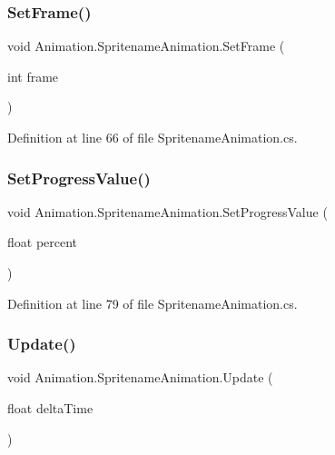 \subsubsection{\texorpdfstring{Set\+Frame()}{SetFrame()}}
{\footnotesize\ttfamily void Animation.\+Spritename\+Animation.\+Set\+Frame (\begin{DoxyParamCaption}\item[{int}]{frame }\end{DoxyParamCaption})}



Definition at line 66 of file Spritename\+Animation.\+cs.

\mbox{\label{class_animation_1_1_spritename_animation_ab1129dc6dce8ca439c814361615d7e25}} 
\subsubsection{\texorpdfstring{Set\+Progress\+Value()}{SetProgressValue()}}
{\footnotesize\ttfamily void Animation.\+Spritename\+Animation.\+Set\+Progress\+Value (\begin{DoxyParamCaption}\item[{float}]{percent }\end{DoxyParamCaption})}



Definition at line 79 of file Spritename\+Animation.\+cs.

\mbox{\label{class_animation_1_1_spritename_animation_a67c81b43217c7f5e5a98c173fdedf75c}} 
\subsubsection{\texorpdfstring{Update()}{Update()}}
{\footnotesize\ttfamily void Animation.\+Spritename\+Animation.\+Update (\begin{DoxyParamCaption}\item[{float}]{delta\+Time }\end{DoxyParamCaption})}



